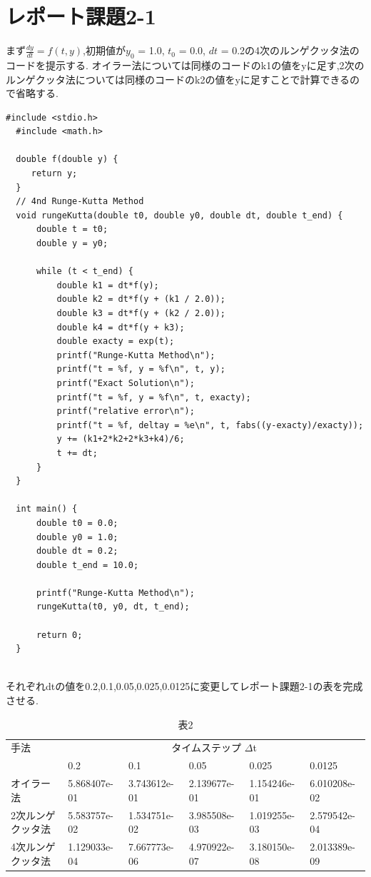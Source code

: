 \documentclass[a4j,10pt,dvipdfmx]{jarticle}
\begin{document}
\section{レポート課題2-1}
まず$\frac{dy}{dt} = f(t,y)$,初期値が$y_0$ = 1.0, $t_0$ = 0.0, $dt$ = 0.2の4次のルンゲクッタ法のコードを提示する.
オイラー法については同様のコードのk1の値をyに足す,2次のルンゲクッタ法については同様のコードのk2の値をyに足すことで計算できるので省略する.
\begin{lstlisting}[label=prm3, caption=4次のルンゲクッタ法]
  #include <stdio.h>
  #include <math.h>
  
  double f(double y) {
     return y; 
  }
  // 4nd Runge-Kutta Method
  void rungeKutta(double t0, double y0, double dt, double t_end) {
      double t = t0;
      double y = y0;
  
      while (t < t_end) {
          double k1 = dt*f(y);
          double k2 = dt*f(y + (k1 / 2.0));
          double k3 = dt*f(y + (k2 / 2.0));
          double k4 = dt*f(y + k3);
          double exacty = exp(t);
          printf("Runge-Kutta Method\n");
          printf("t = %f, y = %f\n", t, y);
          printf("Exact Solution\n");
          printf("t = %f, y = %f\n", t, exacty);
          printf("relative error\n");
          printf("t = %f, deltay = %e\n", t, fabs((y-exacty)/exacty));
          y += (k1+2*k2+2*k3+k4)/6;
          t += dt;
      }
  }
  
  int main() {
      double t0 = 0.0;
      double y0 = 1.0;
      double dt = 0.2;
      double t_end = 10.0;
  
      printf("Runge-Kutta Method\n");
      rungeKutta(t0, y0, dt, t_end);
  
      return 0;
  }
  
\end{lstlisting}
それぞれdtの値を0.2,0.1,0.05,0.025,0.0125に変更してレポート課題2-1の表を完成させる.
\begin{table}[H]
  \label{2}
  \begin{center}
  \caption{表2}
  \begin{tabular}{|l|l|l|l|l|l|}
  \hline
      手法 & \multicolumn{5}{|c|}{タイムステップ $\Delta$t} \\\cline{2-6}
      & 0.2 & 0.1 & 0.05 & 0.025 & 0.0125 \\ \hline
      オイラー法 & 5.868407e-01 & 3.743612e-01 & 2.139677e-01 & 1.154246e-01 & 6.010208e-02 \\ \hline
      2次ルンゲクッタ法 & 5.583757e-02 & 1.534751e-02 & 3.985508e-03 & 1.019255e-03 & 2.579542e-04 \\ \hline
      4次ルンゲクッタ法 & 1.129033e-04 & 7.667773e-06 & 4.970922e-07 & 3.180150e-08 & 2.013389e-09 \\ \hline
  \end{tabular}
\end{center}
\end{table}
\end{document}

